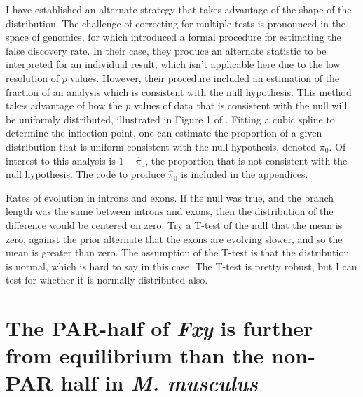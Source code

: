I have established an alternate strategy that takes advantage of the shape of the distribution. The challenge of correcting for multiple tests is pronounced in the space of genomics, for which \cite{Storey2003StatisticalStudies} introduced a formal procedure for estimating the false discovery rate. In their case, they produce an alternate statistic to be interpreted for an individual result, which isn't applicable here due to the low resolution of $p$ values. However, their procedure included an estimation of the fraction of an analysis which is consistent with the null hypothesis. This method takes advantage of how the $p$ values of data that is consistent with the null will be uniformly distributed, illustrated in Figure 1 of \cite{Storey2003StatisticalStudies}. Fitting a cubic spline to determine the inflection point, one can estimate the proportion of a given distribution that is uniform consistent with the null hypothesis, denoted $\hat \pi_{0}$. Of interest to this analysis is $1 -\hat \pi_{0}$, the proportion that is not consistent with the null hypothesis. The code to produce $\hat \pi_{0}$ is included in the appendices. 

Rates of evolution in introns and exons. If the null was true, and the branch length was the same between introns and exons, then the distribution of the difference would be centered on zero. Try a T-test of the null that the mean is zero, against the prior alternate that the exons are evolving slower, and so the mean is greater than zero. The assumption of the T-test is that the distribution is normal, which is hard to say in this case. The T-test is pretty robust, but I can test for whether it is normally distributed also. 






 
\section{The PAR-half of \textit{Fxy} is further from equilibrium than the non-PAR half in \textit{M. musculus}}